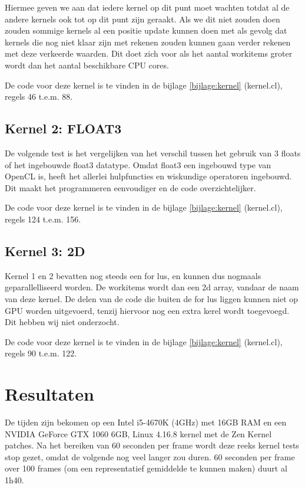 \documentclass[a4paper]{article}
\begin{document}
Hiermee geven we aan dat iedere kernel op dit punt moet wachten totdat al de andere kernels ook tot op dit punt zijn geraakt. Als we dit niet zouden doen zouden sommige kernels al een positie update kunnen doen met als gevolg dat kernels die nog niet klaar zijn met rekenen zouden kunnen gaan verder rekenen met deze verkeerde waarden. Dit doet zich voor als het aantal workitems groter wordt dan het aantal beschikbare CPU cores.

De code voor deze kernel is te vinden in de bijlage \ref{bijlage:kernel} (kernel.cl), regels 46 t.e.m. 88.

\subsection{Kernel 2: FLOAT3}

De volgende test is het vergelijken van het verschil tussen het gebruik van 3 floats of het ingebouwde float3 datatype.
Omdat float3 een ingebouwd type van OpenCL is, heeft het allerlei hulpfuncties en wiskundige operatoren ingebouwd. Dit maakt het programmeren eenvoudiger en de code overzichtelijker.

De code voor deze kernel is te vinden in de bijlage \ref{bijlage:kernel} (kernel.cl), regels 124 t.e.m. 156.

\subsection{Kernel 3: 2D}

Kernel 1 en 2 bevatten nog steeds een for lus, en kunnen dus nogmaals geparallelliseerd worden. De workitems wordt dan een 2d array, vandaar de naam van deze kernel.
De delen van de code die buiten de for lus liggen kunnen niet op GPU worden uitgevoerd, tenzij hiervoor nog een extra kerel wordt toegevoegd. Dit hebben wij niet onderzocht.

De code voor deze kernel is te vinden in de bijlage \ref{bijlage:kernel} (kernel.cl), regels 90 t.e.m. 122.

\section{Resultaten}\label{section:resultaten}

De tijden zijn bekomen op een Intel i5-4670K (4GHz) met 16GB RAM en een NVIDIA GeForce GTX 1060 6GB, Linux 4.16.8 kernel met de Zen Kernel patches.
Na het bereiken van 60 seconden per frame wordt deze reeks kernel tests stop gezet, omdat de volgende nog veel langer zou duren. 60 seconden per frame over 100 frames (om een representatief gemiddelde te kunnen maken) duurt al 1h40.
\end{document}
